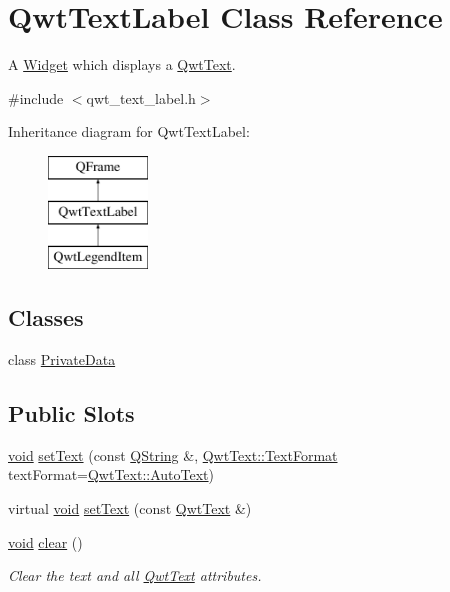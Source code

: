 \hypertarget{class_qwt_text_label}{\section{Qwt\-Text\-Label Class Reference}
\label{class_qwt_text_label}
}


A \hyperlink{class_widget}{Widget} which displays a \hyperlink{class_qwt_text}{Qwt\-Text}.  




{\ttfamily \#include $<$qwt\-\_\-text\-\_\-label.\-h$>$}

Inheritance diagram for Qwt\-Text\-Label\-:\begin{figure}[H]
\begin{center}
\leavevmode
\includegraphics[height=3.000000cm]{class_qwt_text_label}
\end{center}
\end{figure}
\subsection*{Classes}
\begin{DoxyCompactItemize}
\item 
class \hyperlink{class_qwt_text_label_1_1_private_data}{Private\-Data}
\end{DoxyCompactItemize}
\subsection*{Public Slots}
\begin{DoxyCompactItemize}
\item 
\hyperlink{group___u_a_v_objects_plugin_ga444cf2ff3f0ecbe028adce838d373f5c}{void} \hyperlink{class_qwt_text_label_ab300b9a0a6392e180f2caff41ba2b9b8}{set\-Text} (const \hyperlink{group___u_a_v_objects_plugin_gab9d252f49c333c94a72f97ce3105a32d}{Q\-String} \&, \hyperlink{class_qwt_text_a63e0d6a59a427a37ed0bfa71b782fd76}{Qwt\-Text\-::\-Text\-Format} text\-Format=\hyperlink{class_qwt_text_a63e0d6a59a427a37ed0bfa71b782fd76a0645d333081ec9e3574c98f510c284a1}{Qwt\-Text\-::\-Auto\-Text})
\item 
virtual \hyperlink{group___u_a_v_objects_plugin_ga444cf2ff3f0ecbe028adce838d373f5c}{void} \hyperlink{class_qwt_text_label_ac43ba313b78dccf7aa7433f26059b2e2}{set\-Text} (const \hyperlink{class_qwt_text}{Qwt\-Text} \&)
\item 
\hyperlink{group___u_a_v_objects_plugin_ga444cf2ff3f0ecbe028adce838d373f5c}{void} \hyperlink{class_qwt_text_label_a6674cebd85cf692d154f967887547e11}{clear} ()
\begin{DoxyCompactList}\small\item\em Clear the text and all \hyperlink{class_qwt_text}{Qwt\-Text} attributes. \end{DoxyCompactList}\end{DoxyCompactItemize}
